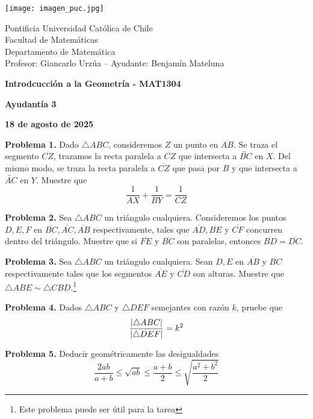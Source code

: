 \documentclass{article}
\begin{document}
\begin{minipage}{2.5cm}
    \texttt{[image: imagen\_puc.jpg]}
\end{minipage}
\begin{minipage}{14cm}
    {\sc Pontificia Universidad Católica de Chile\\
    Facultad de Matemáticas\\
    Departamento de Matemática\\
    Profesor: Giancarlo Urzúa -- Ayudante: Benjamín Mateluna}
\end{minipage}
\vspace{1ex}

{\centerline{\bf Introdcucción a la Geometría - MAT1304}
\centerline{\bf Ayudantía 3}}
\centerline{\bf 18 de agosto de 2025}

\vspace{1cm}
\noindent\textbf{Problema 1.} Dado $\triangle ABC$, consideremos $Z$ un punto en $\overline{AB}$.
Se traza el segmento $\overline{CZ}$, trazamos la recta paralela a $\overline{CZ}$ que intersecta
a $\overleftrightarrow{BC}$ en $X$. Del mismo modo, se traza la recta paralela a $\overline{CZ}$ 
que pasa por $B$ y que intersecta a $\overleftrightarrow{AC}$ en $Y$. Muestre que
\begin{equation*}
    \frac{1}{AX}+\frac{1}{BY}=\frac{1}{CZ}
\end{equation*}

\vspace{5mm}
\noindent\textbf{Problema 2.} Sea $\triangle ABC$ un triángulo cualquiera. Consideremos los puntos 
$D,E,F$ en $\overline{BC},\overline{AC},\overline{AB}$ respectivamente, tales que 
$\overline{AD},\overline{BE}$ y $\overline{CF}$ concurren dentro del triángulo. Muestre que 
si $\overline{FE}$ y $\overline{BC}$ son paralelas, entonces $\overline{BD}=\overline{DC}$.

\vspace{5mm}
\noindent\textbf{Problema 3.} Sea $\triangle ABC$ un triángulo cualquiera. Sean $D,E$ en 
$\overline{AB}$ y $\overline{BC}$ respectivamente tales que los segmentos $\overline{AE}$ y 
$\overline{CD}$ son alturas. Muestre que $\triangle ABE\sim\triangle CBD$.\footnote{Este problema 
puede ser útil para la tarea}

\vspace{5mm}
\noindent\textbf{Problema 4.} Dados $\triangle ABC$ y $\triangle DEF$ semejantes con razón $k$, pruebe que
\begin{equation*}
    \frac{\left|\triangle ABC \right|}{\left|\triangle DEF \right|}=k^{2}
\end{equation*}

\vspace{5mm}
\noindent\textbf{Problema 5.} Deducir geométricamente las desigualdades
\begin{equation*}
    \frac{2ab}{a+b}\leq\sqrt{ab}\leq\frac{a+b}{2}\leq\sqrt{\frac{a^{2}+b^{2}}{2}}
\end{equation*}

\end{document}
